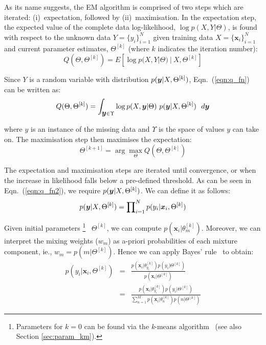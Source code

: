 \documentclass[10pt,a4paper]{article}
\def\Vec#1{{\boldsymbol{#1}}}
\begin{document}
\noindent
As its name suggests, the EM algorithm is comprised of two steps which are iterated: (i)~expectation, followed by (ii)~maximisation.
In the expectation step, the expected value of the complete data log-likelihood, $\log p(X,Y | \Theta)$,
is found with respect to the unknown data $Y = \{y_i\}_{i=1}^{N}$ given training data $X=\{\Vec{x}_i\}_{i=1}^{N}$ and current parameter estimates,
$\Theta^{[k]}$ (where $k$ indicates the iteration number):
%
\begin{equation}
	Q(\Theta, \Theta^{[k]}) = E \left[ \log p(X,Y | \Theta) ~|~ X,\Theta^{[k]} \right]
	\label{eqn:q_fn}
\end{equation}

\noindent
Since $Y$ is a random variable with distribution $p(\mbox{\boldmath $y$}|X,\Theta^{[k]})$, Eqn.~(\ref{eqn:q_fn}) can be written as:
%
\begin{equation}
	Q(\Theta, \Theta^{[k]}) = \int_{\mbox{\boldmath $y$} \in \Upsilon}
								\log p(X,\mbox{\boldmath $y$} | \Theta) ~ p(\mbox{\boldmath $y$}|X,\Theta^{[k]}) ~~ d \mbox{\boldmath $y$}
	\label{eqn:q_fn2}
\end{equation}

\noindent
where \mbox{\boldmath $y$} is an instance of the missing data and $\Upsilon$ is the space of values \mbox{\boldmath $y$} can take on.
The maximisation step then maximises the expectation:
%
\begin{equation}
	\Theta^{[k+1]} = \arg \max_{\Theta} Q(\Theta, \Theta^{[k]})
	\label{eqn:maximize}
\end{equation}

\noindent
The expectation and maximisation steps are iterated until convergence,
or when the increase in likelihood falls below a pre-defined threshold.
As can be seen in Eqn.~(\ref{eqn:q_fn2}), we require $p(\mbox{\boldmath $y$}|X,\Theta^{[k]})$.
We can define it as follows:
%
\begin{equation}
	p(\mbox{\boldmath $y$}|X,\Theta^{[k]}) = \prod\nolimits_{i=1}^{N} p(y_i | \Vec{x}_i, \Theta^{[k]})
\end{equation}

\noindent
Given initial parameters%
%
\footnote{Parameters for $k=0$ can be found via the {\it k}-means algorithm~\cite{Bishop_2006,Duda01,Linde80} (see also Section \ref{sec:param_km}).}
%
~$\Theta^{[k]}$,
we can compute $p(\Vec{x}_i | \theta_m^{[k]})$.
Moreover, we can interpret the mixing weights ($w_m$) as {a-priori} probabilities of each mixture component, ie., $w_m = p(m | \Theta^{[k]})$.
Hence we can apply Bayes' rule~\cite{Duda01} to obtain:
%
\begin{eqnarray}
	p(y_i | \Vec{x}_i, \Theta^{[k]}) & = & \frac{ p(\Vec{x}_i | \theta_{y_i}^{[k]}) p(y_i | \Theta^{[k]}) }{ p(\Vec{x}_i | \Theta^{[k]}) } \\
	~ & = & \frac{ p(\Vec{x}_i | \theta_{y_i}^{[k]}) p(y_i | \Theta^{[k]}) }{ \sum\nolimits_{n=1}^{M} p(\Vec{x}_i | \theta_{n}^{[k]}) p(n | \Theta^{[k]})}
	\label{eqn:p_yi}
\end{eqnarray}
\end{document}
